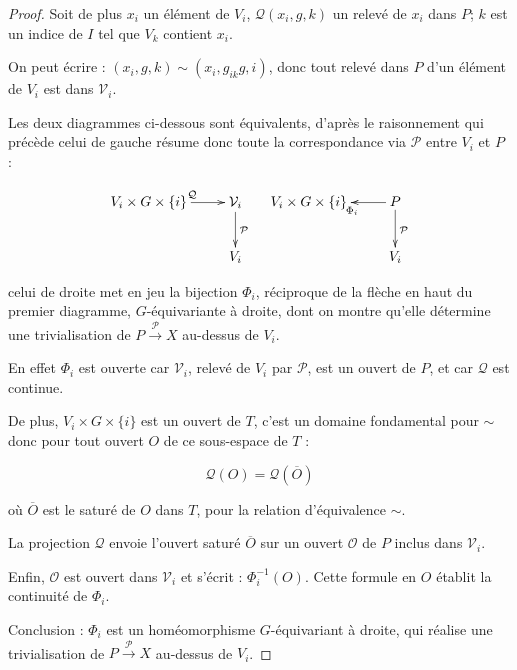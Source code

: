 \begin{proof}
Soit de plus $x_i$ un élément de $V_i$, $\mathcal{Q}(x_i,g,k)$ un relevé de $x_i$ dans $P$; $k$ est un indice de $I$ tel que $V_k$ contient $x_i$.

\par
On peut écrire : $(x_i,g,k) \sim (x_i,g_{ik}g,i)$, %
donc tout relevé dans $P$ d'un élément de $V_i$ est dans $\mathcal{V}_i$.

\par
Les deux diagrammes ci-dessous sont équivalents, d'après le raisonnement qui précède celui de gauche résume donc toute la correspondance via $\mathcal{P}$ entre $V_i$ et $P$ :

\[\xymatrix{V_i \times G \times \{i\} \ar[r]^{\mathcal{Q}} & \mathcal{V}_i \ar[d]^{\mathcal{P}} \\%
& V_i} \quad \xymatrix{V_i \times G \times \{i\} & \ar[l]^{\Phi_i} P \ar[d]^{\mathcal{P}} \\  & V_i}\]

celui de droite met en jeu la bijection $\Phi_i$, réciproque de la flèche en haut du premier diagramme, $G$-équivariante à droite, %
dont on montre qu'elle détermine une trivialisation de $P \xrightarrow{\mathcal{P}} X$ au-dessus de $V_i$.

\par
En effet $\Phi_i$ est ouverte car $\mathcal{V}_i$, relevé de $V_i$ par $\mathcal{P}$, est un ouvert de $P$, et car $\mathcal{Q}$ est continue.

\par
De plus, $V_i \times G \times \{i\}$ est un ouvert de $T$, c'est un domaine fondamental pour $\sim$ donc pour tout ouvert $O$ de ce sous-espace de $T$ :

\[\mathcal{Q}(O) = \mathcal{Q}(\overline{O})\]

où $\overline{O}$ est le saturé de $O$ dans $T$, pour la relation d'équivalence $\sim$.

\par
La projection $\mathcal{Q}$ envoie l'ouvert saturé $\overline{O}$ sur un ouvert $\mathcal{O}$ de $P$ inclus dans $\mathcal{V}_i$.

\par
Enfin, $\mathcal{O}$ est ouvert dans $\mathcal{V}_i$ et s'écrit : $\Phi_i^{-1}(O)$. Cette formule en $O$ établit la continuité de $\Phi_i$.

\par
Conclusion : $\Phi_i$ est un homéomorphisme $G$-équivariant à droite, qui réalise une trivialisation de $P \xrightarrow{\mathcal{P}} X$ au-dessus de $V_i$.


\end{proof}
